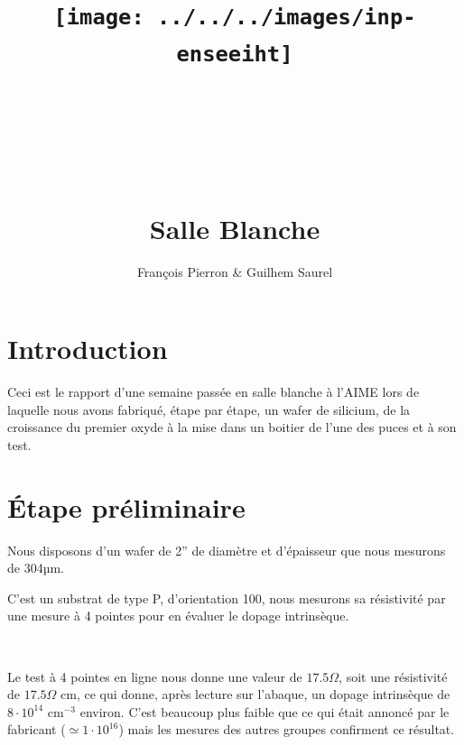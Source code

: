 \documentclass{article}
\title{\texttt{[image: ../../../images/inp-enseeiht]} \\ ~ \\ ~ \\ ~ \\ ~ \\ Salle Blanche}
\author{François Pierron \& Guilhem Saurel}
\date{\oldstylenums{24 janvier 2014}}
\begin{document}
\begin{titlepage}
    \setcounter{page}{0}
    \maketitle
    \vfill
    \tableofcontents
    \thispagestyle{empty}
\end{titlepage}

\section*{Introduction}

Ceci est le rapport d’une semaine passée en salle blanche à l’AIME lors de laquelle nous avons fabriqué, étape par étape, un wafer de silicium, de la croissance du premier oxyde à la mise dans un boitier de l’une des puces et à son test.

\section{Étape préliminaire}

Nous disposons d’un wafer de 2” de diamètre et d’épaisseur que nous mesurons de 304µm.

C’est un substrat de type P, d’orientation 100, nous mesurons sa résistivité par une mesure à 4 pointes pour en évaluer le dopage intrinsèque.

~

Le test à 4 pointes en ligne nous donne une valeur de $17.5 \Omega$, soit une résistivité de $17.5 \Omega$ cm, ce qui donne, après lecture sur l'abaque, un dopage intrinsèque de $8\cdot10^{14}$ cm$^{-3}$ environ. C’est beaucoup plus faible que ce qui était annoncé par le fabricant ($\simeq 1\cdot10^{16}$) mais les mesures des autres groupes confirment ce résultat.
\end{document}

